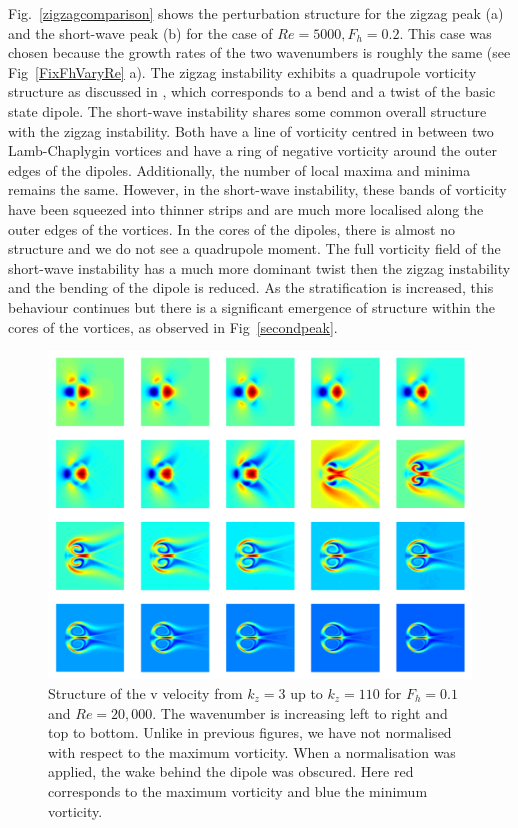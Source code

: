 Fig.~\ref{zigzagcomparison} shows the perturbation structure for the zigzag peak (a) and the short-wave peak (b) for the case of $Re=5000,F_{h}=0.2$. This case was chosen because the growth rates of the two wavenumbers is roughly the same (see Fig~\ref{FixFhVaryRe} a). The zigzag instability exhibits a quadrupole vorticity structure as discussed in \cite{bc2000c}, which corresponds to a bend and a twist of the basic state dipole. The short-wave instability shares some common overall structure with the zigzag instability. Both have a line of vorticity centred in between two Lamb-Chaplygin vortices and have a ring of negative vorticity around the outer edges of the dipoles. Additionally, the number of local maxima and minima remains the same. However, in the short-wave instability, these bands of vorticity have been squeezed into thinner strips and are much more localised along the outer edges of the vortices. In the cores of the dipoles, there is almost no structure and we do not see a quadrupole moment. The full vorticity field of the short-wave instability has a much more dominant twist then the zigzag instability and the bending of the dipole is reduced. As the stratification is increased, this behaviour continues but there is a significant emergence of structure within the cores of the vortices, as observed in Fig~\ref{secondpeak}.


\begin{figure}
\begin{center}
\includegraphics[width=\textwidth]{velocity_field_evolution_u_fh_01_re_20000}
\caption{Structure of the v velocity from $k_{z}=3$ up to $k_{z}=110$ for $F_{h}=0.1$ and $Re=20{,}000$. The wavenumber is increasing left to right and top to bottom. Unlike in previous figures, we have not normalised with respect to the maximum vorticity. When a normalisation was applied, the wake behind the dipole was obscured. Here red corresponds to the maximum vorticity and blue the minimum vorticity. } 
\label{evolution}
\end{center}
\end{figure}

